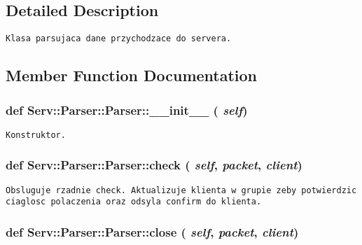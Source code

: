 \subsection{Detailed Description}


\footnotesize\begin{verbatim}Klasa parsujaca dane przychodzace do servera.\end{verbatim}
\normalsize
 

\subsection{Member Function Documentation}
\hypertarget{class_serv_1_1_parser_1_1_parser_8627f07c762983eff029ad167a021e38}{
\subsubsection[{\_\-\_\-init\_\-\_\-}]{\setlength{\rightskip}{0pt plus 5cm}def Serv::Parser::Parser::\_\-\_\-init\_\-\_\- ( {\em self})}}
\label{class_serv_1_1_parser_1_1_parser_8627f07c762983eff029ad167a021e38}




\footnotesize\begin{verbatim}Konstruktor.\end{verbatim}
\normalsize
 \hypertarget{class_serv_1_1_parser_1_1_parser_93e284233267c2db61d20d9239fed4c8}{
\subsubsection[{check}]{\setlength{\rightskip}{0pt plus 5cm}def Serv::Parser::Parser::check ( {\em self}, \/   {\em packet}, \/   {\em client})}}
\label{class_serv_1_1_parser_1_1_parser_93e284233267c2db61d20d9239fed4c8}




\footnotesize\begin{verbatim}Obsluguje rzadnie check. Aktualizuje klienta w grupie zeby potwierdzic ciaglosc polaczenia oraz odsyla confirm do klienta.\end{verbatim}
\normalsize
 \hypertarget{class_serv_1_1_parser_1_1_parser_b6aa6195abf7a68df644640a8e4fd263}{
\subsubsection[{close}]{\setlength{\rightskip}{0pt plus 5cm}def Serv::Parser::Parser::close ( {\em self}, \/   {\em packet}, \/   {\em client})}}
\label{class_serv_1_1_parser_1_1_parser_b6aa6195abf7a68df644640a8e4fd263}




